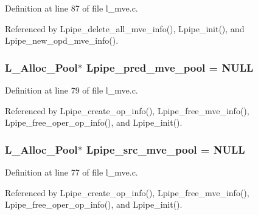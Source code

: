 Definition at line 87 of file l\_\-mve.c.

Referenced by Lpipe\_\-delete\_\-all\_\-mve\_\-info(), Lpipe\_\-init(), and Lpipe\_\-new\_\-opd\_\-mve\_\-info().
\subsubsection{\setlength{\rightskip}{0pt plus 5cm}L\_\-Alloc\_\-Pool$\ast$ \bf{Lpipe\_\-pred\_\-mve\_\-pool} = NULL}\label{l__mve_8c_3c5eb3ef3a82d664ba3a3da10b8e0093}




Definition at line 79 of file l\_\-mve.c.

Referenced by Lpipe\_\-create\_\-op\_\-info(), Lpipe\_\-free\_\-mve\_\-info(), Lpipe\_\-free\_\-oper\_\-op\_\-info(), and Lpipe\_\-init().
\subsubsection{\setlength{\rightskip}{0pt plus 5cm}L\_\-Alloc\_\-Pool$\ast$ \bf{Lpipe\_\-src\_\-mve\_\-pool} = NULL}\label{l__mve_8c_7f8629ad0a52237fabc7b5b90c9a369c}




Definition at line 77 of file l\_\-mve.c.

Referenced by Lpipe\_\-create\_\-op\_\-info(), Lpipe\_\-free\_\-mve\_\-info(), Lpipe\_\-free\_\-oper\_\-op\_\-info(), and Lpipe\_\-init().